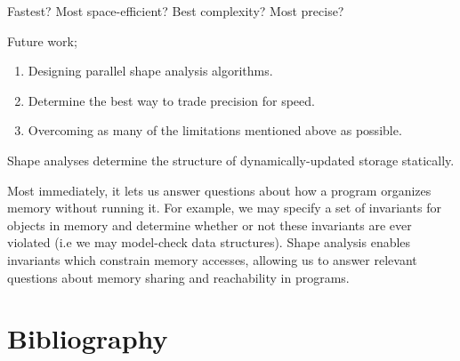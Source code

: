 \documentclass{article}
\begin{document}
Fastest?
Most space-efficient?
Best complexity?
Most precise?

Future work;
\begin{enumerate}[1.]
    \item Designing parallel shape analysis algorithms.
    \item Determine the best way to trade precision for speed.
    \item Overcoming as many of the limitations mentioned above as possible.
\end{enumerate}

Shape analyses determine the structure of dynamically-updated storage
statically.

Most immediately, it lets us answer questions about how a program organizes
memory without running it. For example, we may specify a set of invariants
for objects in memory and determine whether or not these invariants are ever
violated (i.e we may model-check data structures). Shape analysis enables
invariants which constrain memory accesses, allowing us to answer relevant
questions about memory sharing and reachability in programs.

\section{Bibliography}
\end{document}
